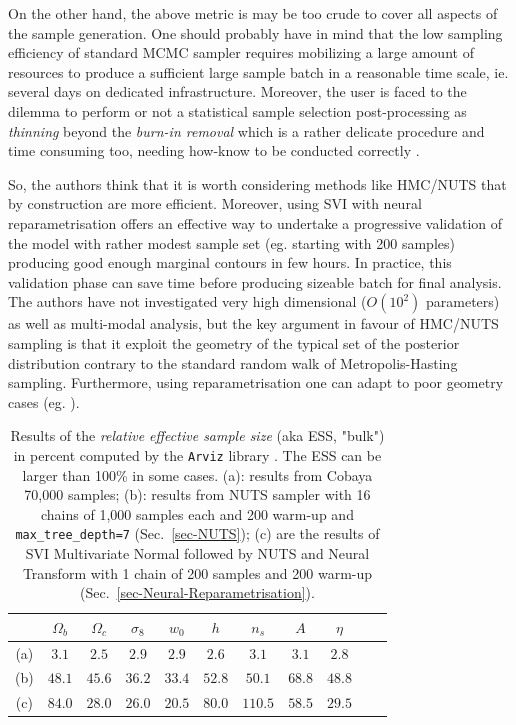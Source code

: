 \documentclass[twocolumn,twocolappendix,nofootinbib]{openjournal}
\begin{document}
On the other hand, the above metric is may be too crude to cover all aspects of the sample generation. One should probably have in mind that the low sampling efficiency of standard MCMC sampler requires mobilizing a large amount of resources to produce a sufficient large sample batch in a reasonable time scale, ie. several days on dedicated infrastructure. Moreover, the user is faced to the dilemma to perform or not a statistical sample selection post-processing as \textit{thinning} beyond the \textit{burn-in removal} which is a rather delicate procedure and time consuming too, needing how-know to be conducted correctly \citep{doi:10.1146/annurev-statistics-040220-091727, 2015arXiv151007727O}. 

So, the authors think that it is worth considering methods like HMC/NUTS that by construction are more efficient. Moreover, using SVI with neural reparametrisation offers an effective way to undertake a progressive validation of the model with rather modest sample set (eg. starting with 200 samples) producing good enough marginal contours in few hours. In practice, this validation phase can save time before producing sizeable batch for final analysis. The authors have not investigated very high dimensional ($O(10^2)$ parameters) as well as multi-modal analysis, but the key argument in favour of HMC/NUTS sampling is that it exploit the geometry of the typical set of the posterior distribution contrary to the standard random walk of Metropolis-Hasting sampling. Furthermore, using reparametrisation  one can adapt to poor geometry cases (eg. \cite{2019arXiv190303704H}).
%
\begin{table}[htb]
\caption{Results of the \textit{relative effective sample size} (aka ESS, "bulk") in percent computed by the \texttt{Arviz} library \citep{arviz_2019}. The ESS can be larger than 100\% in some cases. 
(a): results from Cobaya 70,000 samples;
(b): results from NUTS sampler with 16 chains of 1,000 samples each and 200 warm-up and \texttt{max\_tree\_depth=7} (Sec.~\ref{sec-NUTS}); 
(c) are the results of SVI Multivariate Normal followed by NUTS and Neural Transform  with 1 chain of 200 samples and 200 warm-up (Sec.~\ref{sec-Neural-Reparametrisation}).}
\label{tab-ESS-NUTS_SVI-1}
 \centering
\begin{tabular}{ccccccccccc}
\hline
    & $\Omega_b$ & $\Omega_c$ & $\sigma_8$ & $w_0$ & $h$ & $n_s$ & $A$ & $\eta$\\
\hline
(a) &  $3.1$ & $2.5$       & $2.9$      & $2.9$  & $2.6$  & $3.1$  & $3.1$ & $2.8$ \\  
(b) & $48.1$ &  $45.6$     & $36.2$     & $33.4$ & $52.8$ & $50.1$ & $68.8$ & $48.8$\\
(c) & $84.0$ &  $28.0$     & $26.0$     & $20.5$ & $80.0$ & $110.5$ & $58.5$ & $29.5$\\
\hline
\end{tabular}
\end{table}
\end{document}
